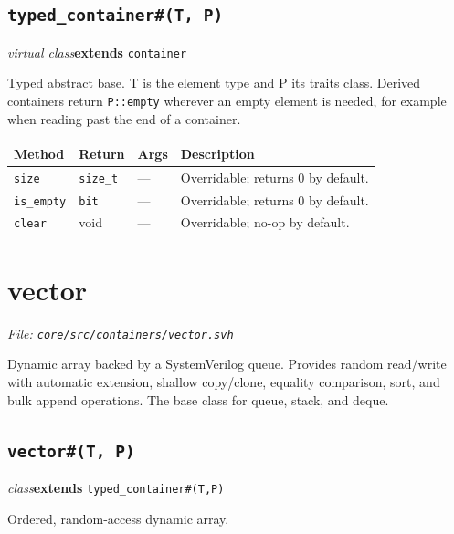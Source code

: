 \documentclass[11pt,letterpaper]{report}
\begin{document}
\subsection*{\texttt{typed\_container\#(T, P)}}
\noindent\small\textit{virtual class}\quad \textbf{extends} \texttt{container}\par

Typed abstract base. T is the element type and P its traits class. Derived containers return \texttt{P::empty} wherever an empty element is needed, for example when reading past the end of a container.

\begin{xltabular}{\linewidth}{>{\small}p{1.35in} >{\small}p{1.25in} >{\small}p{0.95in} >{\small}X}
\toprule
\textbf{Method} & \textbf{Return} & \textbf{Args} & \textbf{Description} \\
\midrule
\endhead
\bottomrule
\endfoot
\texttt{size} & \texttt{size\_t} & --- & Overridable; returns 0 by default. \\
\texttt{is\_empty} & \texttt{bit} & --- & Overridable; returns 0 by default. \\
\texttt{clear} & void & --- & Overridable; no-op by default. \\
\end{xltabular}

\section{vector}
\noindent\small\textit{File: \texttt{core/src/containers/vector.svh}}\par

Dynamic array backed by a SystemVerilog queue. Provides random read/write with automatic extension, shallow copy/clone, equality comparison, sort, and bulk append operations. The base class for queue, stack, and deque.

\subsection*{\texttt{vector\#(T, P)}}
\noindent\small\textit{class}\quad \textbf{extends} \texttt{typed\_container\#(T,P)}\par

Ordered, random-access dynamic array.
\end{document}
